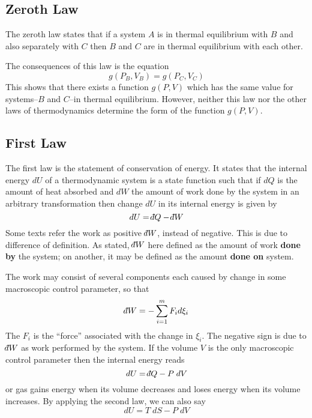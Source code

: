 \documentclass[../../../Main.tex]{subfiles}
\begin{document}
\subsection{Zeroth Law}
The zeroth law states that if a system $A$ is in thermal equilibrium with $B$ and also separately with $C$ then $B$ and $C$ are in thermal equilibrium with each other. 

The consequences of this law is the equation
\begin{equation*}
    g(P_B , V_B ) = g(P_C , V_C )
\end{equation*}
This shows that there exists a function $g(P, V )$ which has the same value for systems--$B$ and $C$--in thermal equilibrium. However, neither this law nor the other laws of thermodynamics determine the form of the function $g(P, V )$.

\subsection{First Law}
The first law is the statement of conservation of energy. It states that the internal energy $dU$ of a thermodynamic system is a state function such that if $d Q$ is the amount of heat absorbed and $d W $ the amount of work done by the system in an arbitrary transformation then change $d U$ in its internal energy is given by
\begin{equation*}
    d U=\dbar Q- \dbar W
\end{equation*}
Some texts refer the work as positive $\dbar W$, instead of negative. This is due to difference of definition. As stated, $\dbar W$ here defined as the amount of work \textbf{done by} the system; on another, it may be defined as the amount \textbf{done on} system.

The work may consist of several components each caused by change in some macroscopic control parameter, so that
\begin{equation*}
    \dbar W=-\sum_{i=1}^{m}F_id\xi_i
\end{equation*}
The $F_i$ is the “force” associated with the change in $\xi_i$. The negative sign is due to $\dbar W$ as work performed by the system. If the volume $V$ is the only macroscopic control parameter then the internal energy reads
\begin{equation*}
    dU=\dbar Q-P\;dV
\end{equation*}
or gas gains energy when its volume decreases and loses energy when its volume increases. By applying the second law, we can also say 
\begin{equation*}
    dU=T\;dS-P\;dV
\end{equation*}
\end{document}

